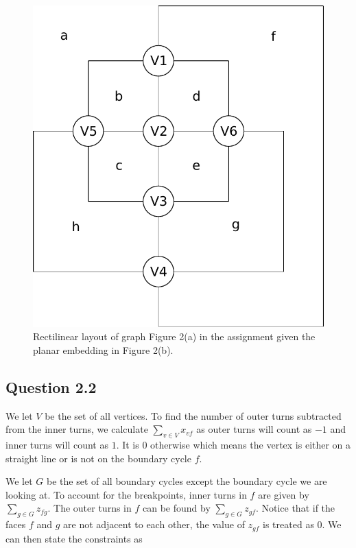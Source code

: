 \documentclass[a4paper]{article}
\begin{document}
\begin{figure}[H]
\centering
\includegraphics[width=\textwidth / 2]{graphics/fig2.pdf}
\caption{Rectilinear layout of graph Figure 2(a) in the assignment given the planar embedding in Figure 2(b).}
\label{fig:ex21figa}
\end{figure}


\subsection{Question 2.2}
We let $V$ be the set of all vertices. To find the number of outer turns subtracted from the inner turns, we calculate $\sum_{v\in V} x_{vf}$ as outer turns will count as $-1$ and inner turns will count as $1$. It is $0$ otherwise which means the vertex is either on a straight line or is not on the boundary cycle $f$.

We let $G$ be the set of all boundary cycles except the boundary cycle we are looking at. To account for the breakpoints, inner turns in $f$ are given by $\sum_{g\in G} z_{fg}$. The outer turns in $f$ can be found by $\sum_{g\in G} z_{gf}$. Notice that if the faces $f$ and $g$ are not adjacent to each other, the value of $z_{gf}$ is treated as $0$. We can then state the constraints as
\end{document}
